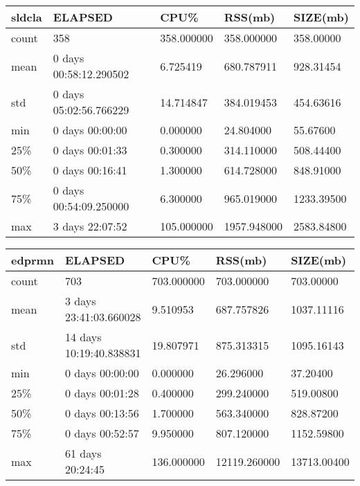 \documentclass{article}
\begin{document}
\begin{tabular}{|l|l|l|l|l|}
\hline 
\hline sldcla& ELAPSED&   CPU\%&  RSS(mb)&   SIZE(mb) \\
\hline count&    358& 358.000000&  358.000000&  358.00000 \\
\hline mean&  0 days 00:58:12.290502&  6.725419&  680.787911&  928.31454 \\
\hline std&  0 days 05:02:56.766229&  14.714847&  384.019453&  454.63616 \\
\hline min&   0 days 00:00:00&  0.000000&  24.804000&  55.67600 \\
\hline 25\%&   0 days 00:01:33&  0.300000&  314.110000&  508.44400 \\
\hline 50\%&   0 days 00:16:41&  1.300000&  614.728000&  848.91000 \\
\hline 75\%&  0 days 00:54:09.250000&  6.300000&  965.019000& 1233.39500 \\
\hline max&   3 days 22:07:52& 105.000000& 1957.948000& 2583.84800 \\
\hline 
\end{tabular}
 
\begin{tabular}{|l|l|l|l|l|}
\hline 
\hline edprmn&    ELAPSED&   CPU\%&   RSS(mb)&  SIZE(mb) \\
\hline count&   703& 703.000000&  703.000000&  703.00000 \\
\hline mean&  3 days 23:41:03.660028&  9.510953&  687.757826&  1037.11116 \\
\hline std&  14 days 10:19:40.838831&  19.807971&  875.313315&  1095.16143 \\
\hline min&   0 days 00:00:00&  0.000000&   26.296000&   37.20400 \\
\hline 25\%&   0 days 00:01:28&  0.400000&  299.240000&  519.00800 \\
\hline 50\%&   0 days 00:13:56&  1.700000&  563.340000&  828.87200 \\
\hline 75\%&   0 days 00:52:57&  9.950000&  807.120000&  1152.59800 \\
\hline max&   61 days 20:24:45& 136.000000& 12119.260000& 13713.00400 \\
\hline 
\end{tabular}
 
\end{document}
